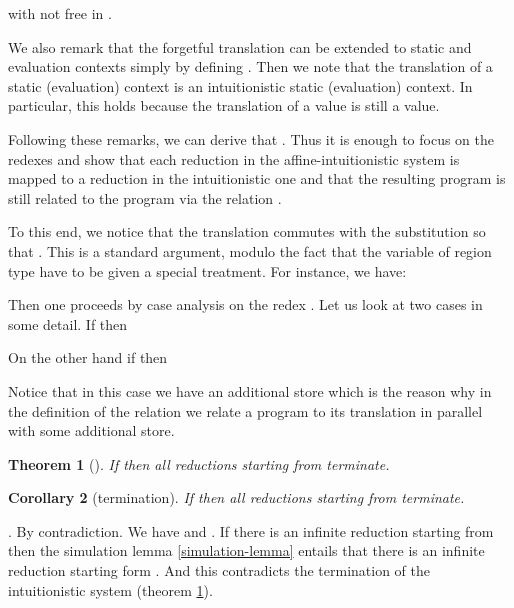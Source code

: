 \documentclass[11pt]{article}
\newtheorem{theorem}{Theorem}
\newtheorem{corollary}[theorem]{Corollary}
\newcommand{\Proof}{\noindent {\sc Proof}. }
\newcommand{\qed}{\hfill}
\begin{document}
with  not free in .

We also remark that the forgetful translation can be extended to static and evaluation contexts
simply by defining . Then we note that
the translation of a static (evaluation) context is an 
intuitionistic static (evaluation) context. In particular, this holds
because the translation of a value is still a value.

Following these remarks, we can derive that .
Thus it is enough to focus on the redexes  and show that each reduction
in the affine-intuitionistic system is mapped to a reduction in the intuitionistic one 
and that the resulting program is still related to the program  via the
relation . 

To this end, we notice that the translation commutes with the substitution
so that . This is a standard argument,
modulo the fact that the variable of region type have to be given a special treatment.
For instance, we have:

Then one proceeds by case analysis on the redex .
Let us look at two cases in some detail.
If  then 

On the other hand if  then

Notice that in this case we have an additional store  which
is the reason why in the definition of the relation  
we relate a program to its translation in parallel with some additional store.
\qed


\begin{theorem}[\cite{Amadio09}]\label{thm-ter-intuitionistic}
If  then all reductions starting from  terminate.
\end{theorem}


\begin{corollary}[termination]
If  then all reductions starting from  terminate.
\end{corollary}
\Proof
By contradiction. 
We have  and 
.
If there is an infinite reduction starting from 
then the simulation lemma \ref{simulation-lemma}
entails that there is an infinite reduction starting
form . 
And this contradicts the termination of the intuitionistic system
(theorem \ref{thm-ter-intuitionistic}).  \qed
\end{document}
